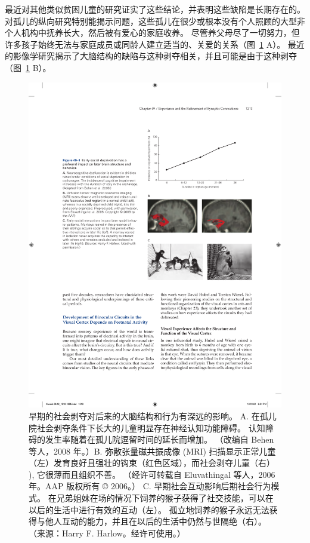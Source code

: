 最近对其他类似贫困儿童的研究证实了这些结论，并表明这些缺陷是长期存在的。
对孤儿的纵向研究特别能揭示问题，这些孤儿在很少或根本没有个人照顾的大型非个人机构中抚养长大，然后被有爱心的家庭收养。
尽管养父母尽了一切努力，但许多孩子始终无法与家庭成员或同龄人建立适当的、关爱的关系（图~\ref{fig:49_1} A）。
最近的影像学研究揭示了大脑结构的缺陷与这种剥夺相关，并且可能是由于这种剥夺（图~\ref{fig:49_1} B）。


\begin{figure}[htbp]
	\centering
	\includegraphics[width=0.9\linewidth]{chap49/fig_49_1}
	\caption{早期的社会剥夺对后来的大脑结构和行为有深远的影响。 A. 在孤儿院社会剥夺条件下长大的儿童明显存在神经认知功能障碍。 认知障碍的发生率随着在孤儿院逗留时间的延长而增加。 （改编自 Behen 等人，2008 年。）B. 弥散张量磁共振成像 (MRI) 扫描显示正常儿童（左）发育良好且强壮的钩束（红色区域），而社会剥夺儿童（右） ), 它很薄而且组织不善。 （经许可转载自 Eluvathingal 等人，2006 年。AAP 版权所有 © 2006。） C. 早期社会互动影响后期社会行为模式。 在兄弟姐妹在场的情况下饲养的猴子获得了社交技能，可以在以后的生活中进行有效的互动（左）。 孤立地饲养的猴子永远无法获得与他人互动的能力，并且在以后的生活中仍然与世隔绝（右）。 （来源：Harry F. Harlow。经许可使用。）}
	\label{fig:49_1}
\end{figure}


